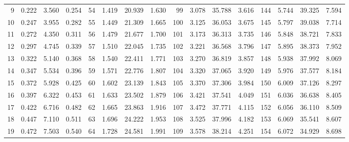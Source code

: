 \begin{table}
{\begin{tabular}{rrrr|rrrr|rrrr|rrrr}
  9 & \tiny{  0.222} &   3.560 & \tiny{  0.254} &  54 & \tiny{  1.419} &  20.939 & \tiny{  1.630} &  99 & \tiny{  3.078} &  35.788 & \tiny{  3.616} & 144 & \tiny{  5.744} &  39.325 & \tiny{  7.594}\\
 10 & \tiny{  0.247} &   3.955 & \tiny{  0.282} &  55 & \tiny{  1.449} &  21.309 & \tiny{  1.665} & 100 & \tiny{  3.125} &  36.053 & \tiny{  3.675} & 145 & \tiny{  5.797} &  39.038 & \tiny{  7.714}\\
 11 & \tiny{  0.272} &   4.350 & \tiny{  0.311} &  56 & \tiny{  1.479} &  21.677 & \tiny{  1.700} & 101 & \tiny{  3.173} &  36.313 & \tiny{  3.735} & 146 & \tiny{  5.848} &  38.721 & \tiny{  7.833}\\
 12 & \tiny{  0.297} &   4.745 & \tiny{  0.339} &  57 & \tiny{  1.510} &  22.045 & \tiny{  1.735} & 102 & \tiny{  3.221} &  36.568 & \tiny{  3.796} & 147 & \tiny{  5.895} &  38.373 & \tiny{  7.952}\\
 13 & \tiny{  0.322} &   5.140 & \tiny{  0.368} &  58 & \tiny{  1.540} &  22.411 & \tiny{  1.771} & 103 & \tiny{  3.270} &  36.819 & \tiny{  3.857} & 148 & \tiny{  5.938} &  37.992 & \tiny{  8.069}\\
 14 & \tiny{  0.347} &   5.534 & \tiny{  0.396} &  59 & \tiny{  1.571} &  22.776 & \tiny{  1.807} & 104 & \tiny{  3.320} &  37.065 & \tiny{  3.920} & 149 & \tiny{  5.976} &  37.577 & \tiny{  8.184}\\
 15 & \tiny{  0.372} &   5.928 & \tiny{  0.425} &  60 & \tiny{  1.602} &  23.139 & \tiny{  1.843} & 105 & \tiny{  3.370} &  37.306 & \tiny{  3.984} & 150 & \tiny{  6.009} &  37.126 & \tiny{  8.297}\\
 16 & \tiny{  0.397} &   6.322 & \tiny{  0.453} &  61 & \tiny{  1.633} &  23.502 & \tiny{  1.879} & 106 & \tiny{  3.421} &  37.541 & \tiny{  4.049} & 151 & \tiny{  6.036} &  36.638 & \tiny{  8.405}\\
 17 & \tiny{  0.422} &   6.716 & \tiny{  0.482} &  62 & \tiny{  1.665} &  23.863 & \tiny{  1.916} & 107 & \tiny{  3.472} &  37.771 & \tiny{  4.115} & 152 & \tiny{  6.056} &  36.110 & \tiny{  8.509}\\
 18 & \tiny{  0.447} &   7.110 & \tiny{  0.511} &  63 & \tiny{  1.696} &  24.222 & \tiny{  1.953} & 108 & \tiny{  3.525} &  37.996 & \tiny{  4.182} & 153 & \tiny{  6.069} &  35.541 & \tiny{  8.607}\\
 19 & \tiny{  0.472} &   7.503 & \tiny{  0.540} &  64 & \tiny{  1.728} &  24.581 & \tiny{  1.991} & 109 & \tiny{  3.578} &  38.214 & \tiny{  4.251} & 154 & \tiny{  6.072} &  34.929 & \tiny{  8.698}\\

\end{tabular}}
\end{table}
